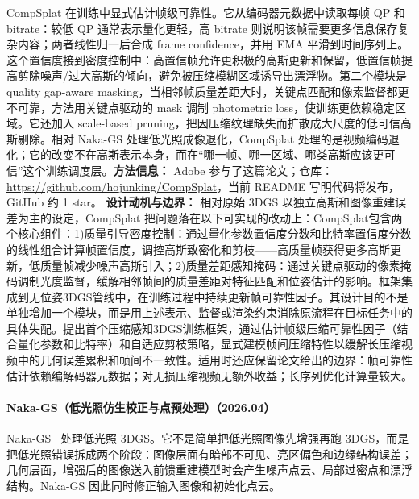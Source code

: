 CompSplat 在训练中显式估计帧级可靠性。它从编码器元数据中读取每帧 QP 和 bitrate：较低 QP 通常表示量化更轻，高 bitrate 则说明该帧需要更多信息保存复杂内容；两者线性归一后合成 frame confidence，并用 EMA 平滑到时间序列上。这个置信度接到密度控制中：高置信帧允许更积极的高斯更新和保留，低置信帧提高剪除噪声/过大高斯的倾向，避免被压缩模糊区域诱导出漂浮物。第二个模块是 quality gap-aware masking，当相邻帧质量差距大时，关键点匹配和像素监督都更不可靠，方法用关键点驱动的 mask 调制 photometric loss，使训练更依赖稳定区域。它还加入 scale-based pruning，把因压缩纹理缺失而扩散成大尺度的低可信高斯剔除。相对 Naka-GS 处理低光照成像退化，CompSplat 处理的是视频编码退化；它的改变不在高斯表示本身，而在“哪一帧、哪一区域、哪类高斯应该更可信”这个训练调度层。\textbf{方法信息：} Adobe 参与了这篇论文；仓库：\url{https://github.com/hojunking/CompSplat}，当前 README 写明代码将发布，GitHub 约 1 star。
\textbf{设计动机与边界：} 相对原始 3DGS 以独立高斯和图像重建误差为主的设定，CompSplat 把问题落在以下可实现的改动上：CompSplat包含两个核心组件：1)质量引导密度控制：通过量化参数置信度分数和比特率置信度分数的线性组合计算帧置信度，调控高斯致密化和剪枝——高质量帧获得更多高斯更新，低质量帧减少噪声高斯引入；2)质量差距感知掩码：通过关键点驱动的像素掩码调制光度监督，缓解相邻帧间的质量差距对特征匹配和位姿估计的影响。框架集成到无位姿3DGS管线中，在训练过程中持续更新帧可靠性因子。其设计目的不是单独增加一个模块，而是用上述表示、监督或渲染约束消除原流程在目标任务中的具体失配。提出首个压缩感知3DGS训练框架，通过估计帧级压缩可靠性因子（结合量化参数和比特率）和自适应剪枝策略，显式建模帧间压缩特性以缓解长压缩视频中的几何误差累积和帧间不一致性。适用时还应保留论文给出的边界：帧可靠性估计依赖编解码器元数据；对无损压缩视频无额外收益；长序列优化计算量较大。
\paragraph{Naka-GS（低光照仿生校正与点预处理）（2026.04）}
Naka-GS~\cite{2604_11142} 处理低光照 3DGS。它不是简单把低光照图像先增强再跑 3DGS，而是把低光照错误拆成两个阶段：图像层面有暗部不可见、亮区偏色和边缘结构误差；几何层面，增强后的图像送入前馈重建模型时会产生噪声点云、局部过密点和漂浮结构。Naka-GS 因此同时修正输入图像和初始化点云。


